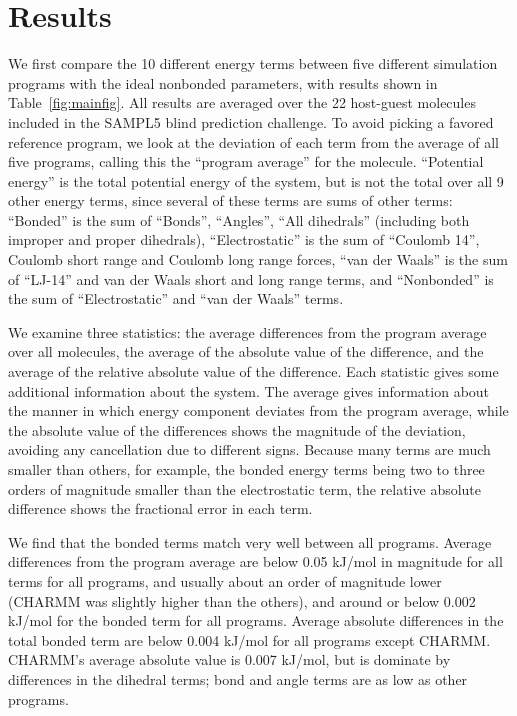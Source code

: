 \section*{Results}
We first compare the 10 different energy terms between five different
simulation programs with the ideal nonbonded parameters, with results
shown in Table~\ref{fig:mainfig}. All results are averaged over the 22
host-guest molecules included in the SAMPL5 blind prediction
challenge. To avoid picking a favored reference program, we look at
the deviation of each term from the average of all five programs,
calling this the ``program average'' for the molecule.  ``Potential
energy'' is the total potential energy of the system, but is not the
total over all 9 other energy terms, since several of these terms are
sums of other terms: ``Bonded'' is the sum of ``Bonds'', ``Angles'',
``All dihedrals'' (including both improper and proper dihedrals),
``Electrostatic'' is the sum of ``Coulomb 14'', Coulomb short range
and Coulomb long range forces, ``van der Waals'' is the sum of
``LJ-14'' and van der Waals short and long range terms, and
``Nonbonded'' is the sum of ``Electrostatic'' and ``van der Waals''
terms.

We examine three statistics: the average differences from the program
average over all molecules, the average of the absolute value of the
difference, and the average of the relative absolute value of the
difference. Each statistic gives some additional information about the
system. The average gives information about the manner in which energy
component deviates from the program average, while the absolute value
of the differences shows the magnitude of the deviation, avoiding any
cancellation due to different signs.  Because many terms are much
smaller than others, for example, the bonded energy terms being two to
three orders of magnitude smaller than the electrostatic term, the
relative absolute difference shows the fractional error in each term.

We find that the bonded terms match very well between all
programs. Average differences from the program average are below 0.05
kJ/mol in magnitude for all terms for all programs, and usually about
an order of magnitude lower (CHARMM was slightly higher than the
others), and around or below 0.002 kJ/mol for the bonded term for all
programs. Average absolute differences in the total bonded term are
below 0.004 kJ/mol for all programs except CHARMM. CHARMM's average
absolute value is 0.007 kJ/mol, but is dominate by differences in the
dihedral terms; bond and angle terms are as low as other programs.

